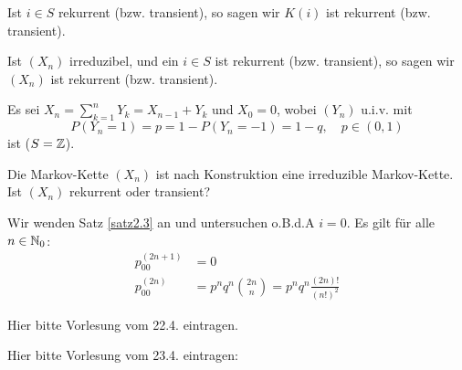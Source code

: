 \documentclass[a4paper,twoside,DIV15,BCOR12mm]{scrbook}
\begin{document}
\begin{bemerkung}
Ist $i\in S$ rekurrent (bzw. transient), so sagen wir $K(i)$ ist rekurrent (bzw. transient).

Ist $(X_n)$ irreduzibel, und ein $i\in S$ ist rekurrent (bzw. transient), so sagen wir $(X_n)$ ist rekurrent (bzw. transient).
\end{bemerkung}

\begin{beispiel}
\label{bsp2.3}
Es sei $X_n=\sum_{k=1}^n Y_k = X_{n-1}+Y_k$ und $X_0=0$, wobei $(Y_n)$ u.i.v. mit \[P(Y_n=1)=p = 1 - P (Y_n=-1) =1-q,\quad p\in (0,1)\] ist ($S=\mathbb{Z}$).

\begin{center}
\end{center}
Die Markov-Kette $(X_n)$ ist nach Konstruktion eine irreduzible Markov-Kette. Ist $(X_n)$ rekurrent oder transient?

Wir wenden Satz \ref{satz2.3} an und untersuchen o.B.d.A $i=0$. Es gilt für alle $n\in \mathbb{N}_0$:
\begin{align*}
p_{00}^{(2n+1)} &= 0\\
p_{00}^{(2n)} &= p^nq^n \binom{2n}{n} = p^nq^n \frac{(2n)!}{(n!)^2}
\end{align*}
\end{beispiel}

\begin{centering}
\Large Hier bitte Vorlesung vom 22.4. eintragen.
\end{centering}

\begin{centering}
\Large Hier bitte Vorlesung vom 23.4. eintragen:
\end{centering}
\end{document}
